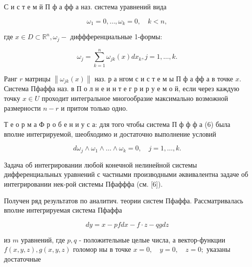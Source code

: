 \documentclass[10pt]{article}
\begin{document}
С и с т е м й П ф а фф а наз. система уравнений вида



\[

\omega_{1}=0, \ldots, \omega_{k}=0, \quad k<n,

\]



где $x \in D \subset \mathbb{R}^{n}, \omega_{j}-$ диффференциальные 1-формы:



\[

\omega_{j}=\sum_{k=1}^{n} \omega_{j k}(x) d x_{k}, j=1, \ldots, k .

\]



Ранг $r$ матрицы $\left\|\omega_{j k}(x)\right\|$ наз. р а нгом с и с т е м ы П ф а фф а в точке $x$. Система Пфаффа наз. в П о л н е и н т е г р и р у е м о й, если через каждую точку $x \in U$ проходит интегральное многообразие максимально возможной размерности $n-r$ и притом только одно.



Т е о р м а Ф р о б е н и у с а: для того чтобы система П ф ф ф а (6) была вполне интегрируемой, шеобходимо и достаточно выполнение условий



\[

d \omega_{j} \wedge \omega_{1} \wedge \ldots \wedge \omega_{k}=0, \quad j=1, \ldots, k .

\]



Задача об интегрировании любой конечной нелинейной системы дифференциальных уравнений с частными производными әквивалентна задаче об интегрировании нек-рой системы Пфафффа (см. [6]).



Получен ряд результатов по аналитич. теории систем Пфаффа. Рассматривалась вполне интегрируемая система Пфаффа



\[

d y=x-p f d x-f \cdot z-q g d z

\]



из $m$ уравнений, где $p, q$ - положительные целые числа, а вектор-функции $f(x, y, z), g(x, y, z)$ голомор ны в точке $x=0, \quad y=0, \quad z=0 ;$ указаны достаточные
\end{document}
